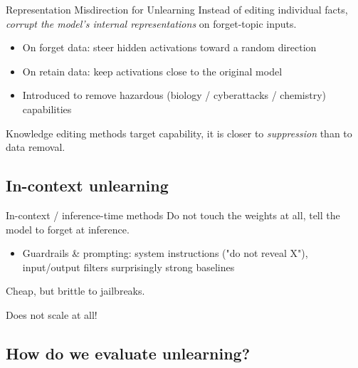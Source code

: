 \documentclass[12pt,aspectratio=169,handout]{beamer}
\begin{document}
\begin{frame}{Representation Misdirection for Unlearning}
Instead of editing individual facts, \emph{corrupt the model's internal
representations} on forget-topic inputs.
\begin{itemize}
    \item On forget data: steer hidden activations toward a
          random direction
    \item On retain data: keep activations close to the original model
    \item Introduced to remove hazardous (biology / cyberattacks / chemistry) capabilities
\end{itemize}


Knowledge editing methods target \alert{capability}, it is closer to \emph{suppression} than to data removal.

\end{frame}

\subsection{In-context unlearning}

\begin{frame}{In-context / inference-time methods}
Do not touch the weights at all, tell the model to forget \alert{at inference}.
\begin{itemize}

    \item \alert{Guardrails \& prompting}: system instructions          ("do not reveal X"), input/output filters surprisingly strong           baselines
\end{itemize}

 
Cheap, but brittle to jailbreaks.


Does not scale at all!
 
\end{frame}

\subsection{How do we evaluate unlearning?}
\end{document}
